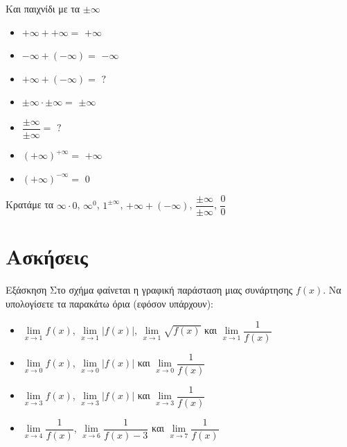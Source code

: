 \documentclass[greek]{beamer}
\begin{document}
\begin{frame}{Και παιχνίδι με τα $\pm\infty$}
  \begin{multicols}{2}
    \begin{itemize}
      \item $+\infty + +\infty=$ \pause $+\infty$ \pause
      \item $-\infty + (-\infty)=$ \pause $-\infty$ \pause
      \item $+\infty + (-\infty)=$ \pause $?$ \pause
      \item $\pm\infty \cdot \pm\infty=$ \pause $\pm\infty$ \pause
      \item $\dfrac{\pm\infty}{\pm\infty}=$ \pause $?$ \pause
      \item $(+\infty)^{+\infty}=$ \pause $+\infty$ \pause
      \item $(+\infty)^{-\infty}=$ \pause $0$ \pause
    \end{itemize}
  \end{multicols}
  Κρατάμε τα $\infty\cdot 0$, $\infty^0$, $1^{\pm\infty}$, $+\infty + (-\infty)$, $\dfrac{\pm\infty}{\pm\infty}$, $\dfrac{0}{0}$
\end{frame}

\section{Ασκήσεις}
\begin{frame}{Εξάσκηση}
  Στο σχήμα
  \href{https://www.geogebra.org/m/xzc6usbm}{}
  φαίνεται η γραφική παράσταση μιας συνάρτησης $f(x)$. Να υπολογίσετε τα παρακάτω όρια (εφόσον υπάρχουν):
  \begin{itemize}
    \item $\lim\limits_{x \to 1}{ f(x) }$, $\lim\limits_{x \to 1}{ |f(x)| }$, $\lim\limits_{x \to 1}{ \sqrt{f(x)} }$ και $\lim\limits_{x \to 1}{ \dfrac{1}{f(x)} }$ \pause
    \item $\lim\limits_{x \to 0}{ f(x) }$, $\lim\limits_{x \to 0}{ |f(x)| }$ και $\lim\limits_{x \to 0}{ \dfrac{1}{f(x)} }$ \pause
    \item $\lim\limits_{x \to 3}{ f(x) }$, $\lim\limits_{x \to 3}{ |f(x)| }$ και $\lim\limits_{x \to 3}{ \dfrac{1}{f(x)} }$ \pause
    \item $\lim\limits_{x \to 4}{ \dfrac{1}{f(x)} }$, $\lim\limits_{x \to 6}{ \dfrac{1}{f(x)-3} }$ και $\lim\limits_{x \to 7}{ \dfrac{1}{f(x)} }$
  \end{itemize}
\end{frame}
\end{document}
